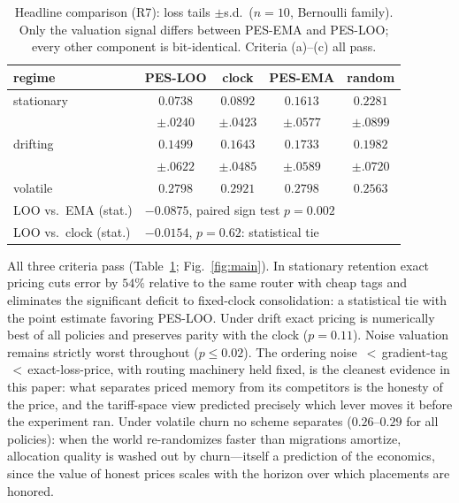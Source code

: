 \documentclass[10pt,twocolumn]{article}
\theoremstyle{definition}
\newcommand{\PES}{PES}
\begin{document}
\begin{table}[t]
\centering\small
\caption{Headline comparison ({R7}): loss tails $\pm$s.d.\ ($n{=}10$, Bernoulli family). Only the valuation
signal differs between \PES{}-{EMA} and \PES{}-{LOO}; every other component is bit-identical. Criteria
(a)--(c) all pass.}
\label{tab:loo}
\setlength{\tabcolsep}{3pt}\footnotesize
\begin{tabular}{@{}lcccc@{}}
\toprule
regime & \PES{}-LOO & clock & \PES{}-EMA & random \\
\midrule
stationary & $\mathbf{0.0738}$ & $0.0892$ & $0.1613$ & $0.2281$ \\
           & $\pm.0240$ & $\pm.0423$ & $\pm.0577$ & $\pm.0899$ \\
drifting   & $\mathbf{0.1499}$ & $0.1643$ & $0.1733$ & $0.1982$ \\
           & $\pm.0622$ & $\pm.0485$ & $\pm.0589$ & $\pm.0720$ \\
volatile   & $0.2798$ & $0.2921$ & $0.2798$ & $0.2563$ \\
\midrule
LOO vs.\ EMA (stat.) & \multicolumn{4}{l}{$-0.0875$, paired sign test $p=0.002$}\\
LOO vs.\ clock (stat.) & \multicolumn{4}{l}{$-0.0154$, $p=0.62$: statistical tie}\\
\bottomrule
\end{tabular}
\end{table}

All three criteria pass (Table~\ref{tab:loo}; Fig.~\ref{fig:main}). In stationary retention exact pricing
cuts error by $54\%$ relative to the same router with cheap tags and eliminates the significant deficit to
fixed-clock consolidation: a statistical tie with the point estimate favoring \PES{}-LOO. Under drift exact
pricing is numerically best of all policies and preserves parity with the clock ($p=0.11$). Noise valuation
remains strictly worst throughout ($p\le0.02$). The ordering noise $\,<\,$gradient-tag$\,<\,$exact-loss-price,
with routing machinery held fixed, is the cleanest evidence in this paper: what separates priced memory from
its competitors is the honesty of the price, and the tariff-space view predicted precisely which lever moves
it before the experiment ran. Under volatile churn no scheme separates ($0.26$--$0.29$ for all policies):
when the world re-randomizes faster than migrations amortize, allocation quality is washed out by
churn---itself a prediction of the economics, since the value of honest prices scales with the horizon over
which placements are honored.
\end{document}
